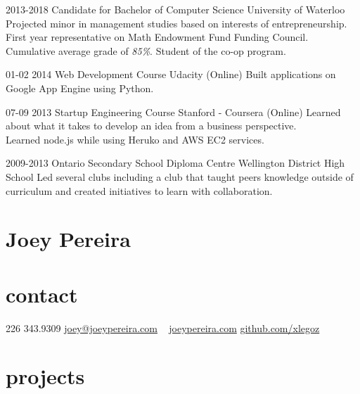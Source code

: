 \documentclass[]{friggeri-cv}
\newcommand{\imp}[1] {{\em #1}}
\begin{document}
\begin{entrylist}
  \entry
    {2013-2018}
    {Candidate for Bachelor of Computer Science}
    {University of Waterloo}
	{Projected minor in management studies based on interests of entrepreneurship. \\
	First year representative on Math Endowment Fund Funding Council. \\
	Cumulative average grade of \imp{85\%}. Student of the co-op program.
	\\ %
 }
 
 \entry
  	{01-02 2014}
  	{Web Development Course}
  	{Udacity (Online)}
  	{Built applications on Google App Engine using Python. }
	
  \entry
  	{07-09 2013}
  	{Startup Engineering Course}
  	{Stanford - Coursera (Online)}
  	{Learned about what it takes to develop an idea from a business perspective. \\
  	Learned node.js while using Heruko and AWS EC2 services.}
  	
  \entry
  	{2009-2013}
  	{Ontario Secondary School Diploma}
  	{Centre Wellington District High School}
    {Led several clubs including a club that taught peers knowledge outside of curriculum and created initiatives to learn with collaboration.}
\end{entrylist}

\newpage 

\begin{asidetwo}  	
	\section{Joey Pereira}
	\section{contact}
    226 343.9309
    \href{mailto:joey@joeypereira.com}{joey@joeypereira.com}
    ~
    \href{http://joeypereira.com}{joeypereira.com}
    \href{http://www.github.com/xlegoz}{github.com/xlegoz}
\end{asidetwo}


\section{projects}
\end{document}
